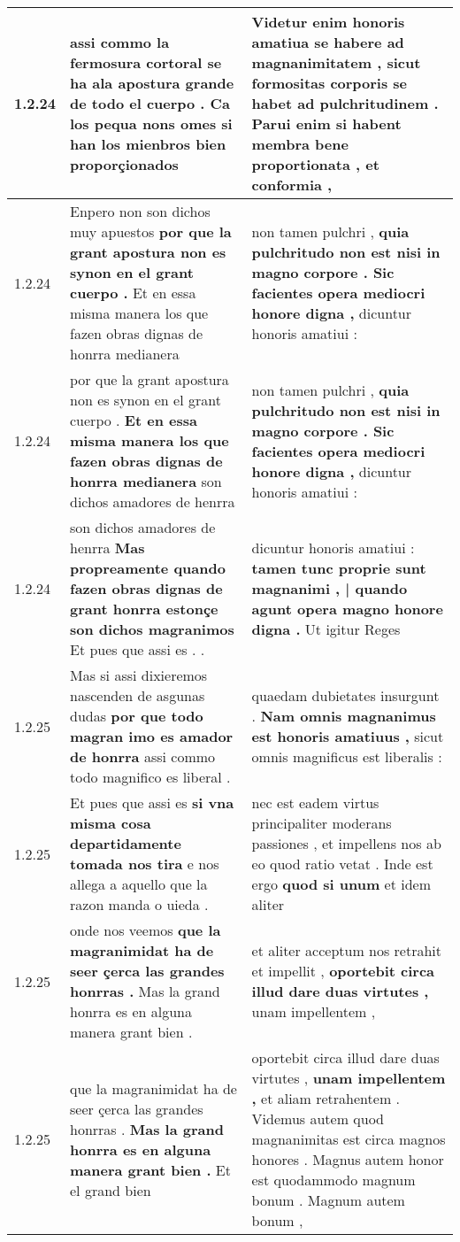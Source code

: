 \begin{tabular}{|p{1cm}|p{6.5cm}|p{6.5cm}|}
1.2.24 & assi commo la fermosura cortoral se ha ala apostura grande de todo el cuerpo . \textbf{ Ca los pequa nons omes } si han los mienbros bien proporçionados & Videtur enim honoris amatiua se habere ad magnanimitatem , \textbf{ sicut formositas corporis se habet ad pulchritudinem . Parui enim si habent membra bene proportionata , } et conformia , \\\hline
1.2.24 & Enpero non son dichos muy apuestos \textbf{ por que la grant apostura non es synon en el grant cuerpo . } Et en essa misma manera los que fazen obras dignas de honrra medianera & non tamen pulchri , \textbf{ quia pulchritudo non est nisi in magno corpore . Sic facientes opera mediocri honore digna , } dicuntur honoris amatiui : \\\hline
1.2.24 & por que la grant apostura non es synon en el grant cuerpo . \textbf{ Et en essa misma manera los que fazen obras dignas de honrra medianera } son dichos amadores de henrra & non tamen pulchri , \textbf{ quia pulchritudo non est nisi in magno corpore . Sic facientes opera mediocri honore digna , } dicuntur honoris amatiui : \\\hline
1.2.24 & son dichos amadores de henrra \textbf{ Mas propreamente quando fazen obras dignas de grant honrra estonçe son dichos magranimos } Et pues que assi es . . & dicuntur honoris amatiui : \textbf{ tamen tunc proprie sunt magnanimi , | quando agunt opera magno honore digna . } Ut igitur Reges \\\hline
1.2.25 & Mas si assi dixieremos nascenden de asgunas dudas \textbf{ por que todo magran imo es amador de honrra } assi commo todo magnifico es liberal . & quaedam dubietates insurgunt . \textbf{ Nam omnis magnanimus est honoris amatiuus , } sicut omnis magnificus est liberalis : \\\hline
1.2.25 & Et pues que assi es \textbf{ si vna misma cosa departidamente tomada nos tira } e nos allega a aquello que la razon manda o uieda . & nec est eadem virtus principaliter moderans passiones , et impellens nos ab eo quod ratio vetat . Inde est ergo \textbf{ quod si unum } et idem aliter \\\hline
1.2.25 & onde nos veemos \textbf{ que la magranimidat ha de seer çerca las grandes honrras . } Mas la grand honrra es en alguna manera grant bien . & et aliter acceptum nos retrahit et impellit , \textbf{ oportebit circa illud dare duas virtutes , } unam impellentem , \\\hline
1.2.25 & que la magranimidat ha de seer çerca las grandes honrras . \textbf{ Mas la grand honrra es en alguna manera grant bien . } Et el grand bien & oportebit circa illud dare duas virtutes , \textbf{ unam impellentem , } et aliam retrahentem . Videmus autem quod magnanimitas est circa magnos honores . Magnus autem honor est quodammodo magnum bonum . Magnum autem bonum , \\\hline

\end{tabular}
